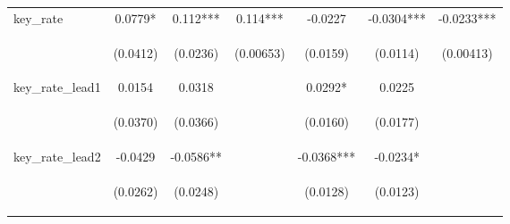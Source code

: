 \documentclass[]{article}
\begin{document}
\begin{center}
\begin{tabular}{lcccccc}
key\_rate & 0.0779* & 0.112*** & 0.114*** & -0.0227 & -0.0304*** & -0.0233*** \\
\vspace{4pt} & \begin{footnotesize}(0.0412)\end{footnotesize} & \begin{footnotesize}(0.0236)\end{footnotesize} & \begin{footnotesize}(0.00653)\end{footnotesize} & \begin{footnotesize}(0.0159)\end{footnotesize} & \begin{footnotesize}(0.0114)\end{footnotesize} & \begin{footnotesize}(0.00413)\end{footnotesize} \\
key\_rate\_lead1 & 0.0154 & 0.0318 &  & 0.0292* & 0.0225 &  \\
\vspace{4pt} & \begin{footnotesize}(0.0370)\end{footnotesize} & \begin{footnotesize}(0.0366)\end{footnotesize} & \begin{footnotesize}\end{footnotesize} & \begin{footnotesize}(0.0160)\end{footnotesize} & \begin{footnotesize}(0.0177)\end{footnotesize} & \begin{footnotesize}\end{footnotesize} \\
key\_rate\_lead2 & -0.0429 & -0.0586** &  & -0.0368*** & -0.0234* &  \\
\vspace{4pt} & \begin{footnotesize}(0.0262)\end{footnotesize} & \begin{footnotesize}(0.0248)\end{footnotesize} & \begin{footnotesize}\end{footnotesize} & \begin{footnotesize}(0.0128)\end{footnotesize} & \begin{footnotesize}(0.0123)\end{footnotesize} & \begin{footnotesize}\end{footnotesize} \\

\end{tabular}
\end{center}
\end{document}
